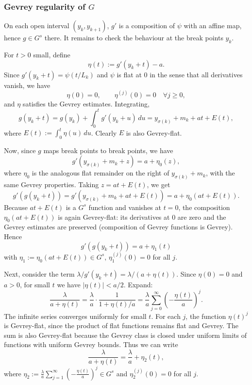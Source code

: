 \documentclass{amsart}
\begin{document}
	\vspace{1ex}
	
	\subsubsection{Gevrey regularity of \(G\)}
	
	
	On each open interval \((y_k,y_{k+1})\), \(g'\) is a composition of \(\psi\) with an affine map, hence \(g\in G^s\) there. It remains to check the behaviour at the break points \(y_k\).
	
	For \(t>0\) small, define
	\[
	\eta(t):=g'(y_k+t)-a.
	\]
	Since \(g'(y_k+t)=\psi(t/L_k)\) and \(\psi\) is flat at \(0\) in the sense that all derivatives vanish, we have
	\[
	\eta(0)=0,\qquad \eta^{(j)}(0)=0\quad\forall j\ge0,
	\]
	and \(\eta\) satisfies the Gevrey estimates.
	Integrating,
	\[
	g(y_k+t)=g(y_k)+\int_0^t g'(y_k+u)\,du
	= y_{\sigma(k)}+m_k+a t+E(t),
	\]
	where \(E(t):=\int_0^t\eta(u)\,du\). Clearly \(E\) is also Gevrey-flat.
	
	Now, since \(g\) maps break points to break points, we have
	\[
	g'(y_{\sigma(k)}+m_k+z)=a+\eta_0(z),
	\]
	where \(\eta_0\) is the analogous flat remainder on the right of \(y_{\sigma(k)}+m_k\), with the same Gevrey properties. Taking \(z=a t+E(t)\), we get
	\[
	g'(g(y_k+t)) = g'(y_{\sigma(k)}+m_k+a t+E(t))
	= a+\eta_0(a t+E(t)).
	\]
	Because \(a t+E(t)\) is a \(G^s\) function and vanishes at \(t=0\), the composition \(\eta_0(a t+E(t))\) is again Gevrey-flat: its derivatives at 0 are zero and the Gevrey estimates are preserved (composition of Gevrey functions is Gevrey). Hence
	\[
	g'(g(y_k+t))=a+\eta_1(t)
	\]
	with \(\eta_1:=\eta_0(a t+E(t))\in G^s\), \(\eta_1^{(j)}(0)=0\) for all \(j\).
	
	Next, consider the term \(\lambda/g'(y_k+t)=\lambda/(a+\eta(t))\). Since \(\eta(0)=0\) and \(a>0\), for small \(t\) we have \(|\eta(t)|<a/2\). Expand:
	\[
	\frac{\lambda}{a+\eta(t)}
	= \frac{\lambda}{a}\cdot\frac{1}{1+\eta(t)/a}
	= \frac{\lambda}{a}\sum_{j=0}^{\infty}\left(-\frac{\eta(t)}{a}\right)^j.
	\]
	The infinite series converges uniformly for small \(t\). For each \(j\), the function \(\eta(t)^j\) is Gevrey-flat, since the product of flat functions remains flat and Gevrey. The sum is also Gevrey-flat because the Gevrey class is closed under uniform limits of functions with uniform Gevrey bounds. Thus we can write
	\[
	\frac{\lambda}{a+\eta(t)} = \frac{\lambda}{a} + \eta_2(t),
	\]
	where \(\eta_2:=\frac{\lambda}{a} \sum_{j=1}^{\infty}\left(-\frac{\eta(t)}{a}\right)^j\in G^s\) and \(\eta_2^{(j)}(0)=0\) for all \(j\).
	
\end{document}
